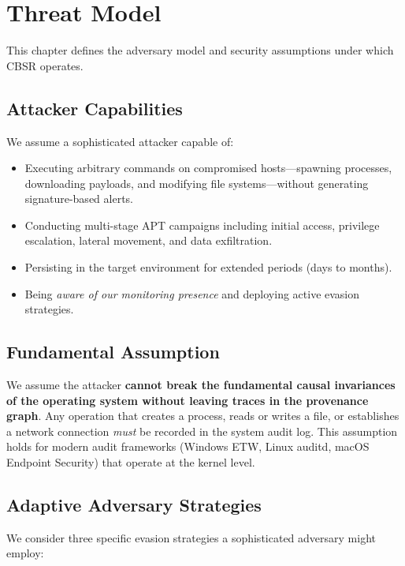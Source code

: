 \chapter{Threat Model}
\label{ch:threat_model}

This chapter defines the adversary model and security assumptions under which CBSR operates.

\section{Attacker Capabilities}

We assume a sophisticated attacker capable of:
\begin{itemize}
\item Executing arbitrary commands on compromised hosts---spawning processes, downloading
    payloads, and modifying file systems---without generating signature-based alerts.
\item Conducting multi-stage APT campaigns including initial access, privilege escalation,
    lateral movement, and data exfiltration.
\item Persisting in the target environment for extended periods (days to months).
\item Being \emph{aware of our monitoring presence} and deploying active evasion strategies.
\end{itemize}

\section{Fundamental Assumption}

We assume the attacker \textbf{cannot break the fundamental causal invariances of the operating
system without leaving traces in the provenance graph}. Any operation that creates a process,
reads or writes a file, or establishes a network connection \emph{must} be recorded in the
system audit log. This assumption holds for modern audit frameworks (Windows ETW, Linux auditd,
macOS Endpoint Security) that operate at the kernel level.

\section{Adaptive Adversary Strategies}

We consider three specific evasion strategies a sophisticated adversary might employ:

